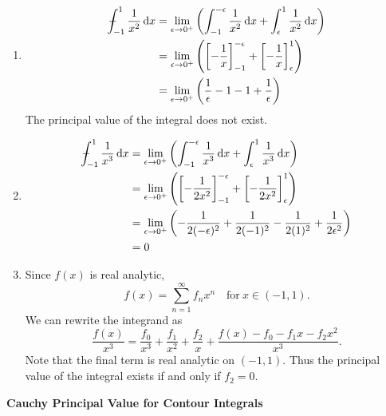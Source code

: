 {%
\begin{Solution}
  \label{solution cpv 1/x^2}
  \begin{enumerate}
  \item
    \begin{align*}
      - \negthickspace \negthickspace \negthickspace \negmedspace \int_{-1}^1 \frac{1}{x^2} \,\mathrm{d} x
      &= \lim_{\epsilon \to 0^+} \left(
        \int_{-1}^{-\epsilon} \frac{1}{x^2} \,\mathrm{d} x
        + \int_\epsilon^1 \frac{1}{x^2} \,\mathrm{d} x \right) \\
      &= \lim_{\epsilon \to 0^+} \left(
        \left[ -\frac{1}{x} \right]_{-1}^{-\epsilon}
        + \left[ -\frac{1}{x} \right]_\epsilon^1 \right) \\
      &= \lim_{\epsilon \to 0^+} \left(
        \frac{1}{\epsilon} -1 - 1 + \frac{1}{\epsilon} \right)
    \end{align*}
    The principal value of the integral does not exist.
  \item
    \begin{align*}
      - \negthickspace \negthickspace \negthickspace \negmedspace \int_{-1}^1 \frac{1}{x^3} \,\mathrm{d} x
      &= \lim_{\epsilon \to 0^+} \left(
        \int_{-1}^{-\epsilon} \frac{1}{x^3} \,\mathrm{d} x
        + \int_\epsilon^1 \frac{1}{x^3} \,\mathrm{d} x \right) \\
      &= \lim_{\epsilon \to 0^+} \left(
        \left[ -\frac{1}{2x^2} \right]_{-1}^{-\epsilon}
        + \left[ -\frac{1}{2x^2} \right]_\epsilon^1 \right) \\
      &= \lim_{\epsilon \to 0^+} \left(
        -\frac{1}{2(-\epsilon)^2} +\frac{1}{2(-1)^2} 
        - \frac{1}{2(1)^2} + \frac{1}{2\epsilon^2} \right) \\
      &= 0
    \end{align*}
  \item
    Since $f(x)$ is real analytic, 
    \[
    f(x) = \sum_{n = 1}^\infty f_n x^n \quad \mathrm{for}\ x \in (-1,1).
    \]
    We can rewrite the integrand as
    \[
    \frac{f(x)}{x^3} = \frac{f_0}{x^3} + \frac{f_1}{x^2} + \frac{f_2}{x}
    + \frac{f(x)-f_0 -f_1 x - f_2 x^2}{x^3}.
    \]
    Note that the final term is real analytic on $(-1,1)$.  Thus the principal
    value of the integral exists if and only if $f_2 = 0$.
  \end{enumerate}
\end{Solution}





\begin{large}
  \noindent
  \textbf{Cauchy Principal Value for Contour Integrals}
\end{large}



}
